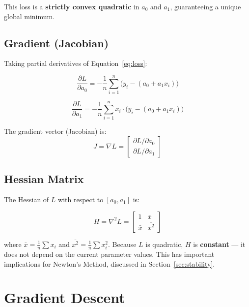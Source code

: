 \documentclass[12pt,a4paper]{article}
\begin{document}
This loss is a \textbf{strictly convex quadratic} in \(a_0\) and \(a_1\), guaranteeing
a unique global minimum.

\subsection{Gradient (Jacobian)}

Taking partial derivatives of Equation~\eqref{eq:loss}:

\begin{equation}
    \frac{\partial L}{\partial a_0} = -\frac{1}{n}\sum_{i=1}^{n}
    \bigl(y_i - (a_0 + a_1 x_i)\bigr)
\end{equation}

\begin{equation}
    \frac{\partial L}{\partial a_1} = -\frac{1}{n}\sum_{i=1}^{n}
    x_i \cdot \bigl(y_i - (a_0 + a_1 x_i)\bigr)
\end{equation}

The gradient vector (Jacobian) is:
\begin{equation}
    J = \nabla L = \begin{bmatrix}
        \partial L / \partial a_0 \\
        \partial L / \partial a_1
    \end{bmatrix}
\end{equation}

\subsection{Hessian Matrix}

The Hessian of \(L\) with respect to \([a_0, a_1]\) is:

\begin{equation}
    H = \nabla^2 L = \begin{bmatrix}
        1 & \bar{x} \\
        \bar{x} & \overline{x^2}
    \end{bmatrix}
\end{equation}

where \(\bar{x} = \frac{1}{n}\sum x_i\) and \(\overline{x^2} = \frac{1}{n}\sum x_i^2\).
Because \(L\) is quadratic, \(H\) is \textbf{constant} — it does not depend on the
current parameter values. This has important implications for Newton's Method, discussed
in Section~\ref{sec:stability}.

\section{Gradient Descent}
\label{sec:gd}
\end{document}
